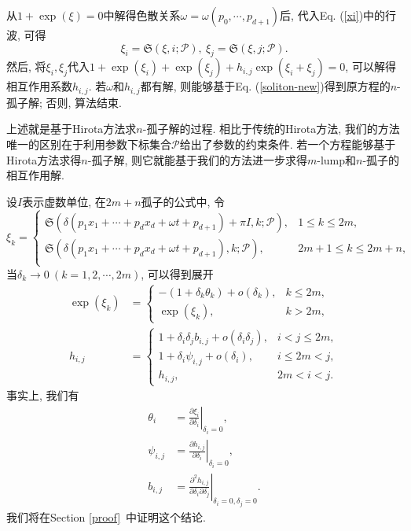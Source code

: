 \documentclass[12pt,a4paper,UTF8]{article}
\numberwithin{equation}{section}
\newcommand{\sbrace}[1]{\left(#1\right)}
\newcommand{\eval}[2]{\left.{#1}\right|_{#2}}
\newcommand{\PS}{\mathcal{P}}
\newcommand{\DIFF}[2]{\ensuremath{\frac{\partial #1}{\partial #2}}}
\newcommand{\SP}{\mathfrak{S}} %
\newcommand{\refeqn}[1]{Eq. (\ref{#1})}
\newcommand{\refsec}[1]{Section \ref{#1}~}
\newcommand{\MLNS}{$m$-lump和$n$-孤子的相互作用解}
\begin{document}
从$1+\exp(\xi)=0$中解得色散关系$\omega=\omega(p_0,\cdots,p_{d+1})$后, 代入\refeqn{xi}中的行波, 可得
\begin{equation}
  \xi_i=\SP\sbrace{\xi,i;\PS} , ~ \xi_j=\SP\sbrace{\xi,j;\PS} .
\end{equation}
然后, 将$\xi_i,\xi_j$代入$1+\exp(\xi_i)+\exp(\xi_j)+h_{i,j}\exp(\xi_i+\xi_j)=0$, 可以解得相互作用系数$h_{i,j}$. 若$\omega$和$h_{i,j}$都有解, 则能够基于\refeqn{soliton-new}得到原方程的$n$-孤子解; 否则, 算法结束. 

上述就是基于Hirota方法求$n$-孤子解的过程. 相比于传统的Hirota方法, 我们的方法唯一的区别在于利用参数下标集合$\PS$给出了参数的约束条件. 若一个方程能够基于Hirota方法求得$n$-孤子解, 则它就能基于我们的方法进一步求得\MLNS{}. 

设$I$表示虚数单位, 在$2m+n$孤子的公式中, 令
\begin{equation}
\xi_k=\left\{\begin{array}{ll}
  \SP\sbrace{\delta\sbrace{p_1 x_1+\cdots+p_d x_d+\omega t+p_{d+1}} +\pi I,k;\PS} ,&  1\le k\le 2m,\\
  \SP\sbrace{\delta\sbrace{p_1 x_1+\cdots+p_d x_d+\omega t+p_{d+1}},k;\PS} ,&  2m+1\le k \le 2m+n, \\
\end{array}\right. 
\end{equation}
当$\delta_k\to 0~(k=1,2,\cdots,2m)$, 可以得到展开
\begin{equation}
\begin{aligned}
  \exp\sbrace{\xi_k}&=\left\{\begin{array}{ll}
    -\sbrace{1+\delta_k \theta_k}+o\sbrace{\delta_k}, & k\le 2m, \\ 
    \exp\sbrace{\xi_k}, & k>2m,   
    \end{array}\right. \\ 
  h_{i,j}&=\left\{\begin{array}{ll}
    1+\delta_i \delta_j b_{i,j}+o\sbrace{\delta_i \delta_j}, & i<j\le 2m, \\
    1+\delta_i \psi_{i,j}+o\sbrace{\delta_i}, & i\le 2m < j , \\
    h_{i,j}, & 2m<i<j.
    \end{array}\right.
\end{aligned}
\label{expand}
\end{equation}
事实上, 我们有 
\begin{equation}
\begin{aligned} 
\theta_i &= \eval{\DIFF{\xi_i}{\delta_i}}{\delta_i=0},\\ 
\psi_{i,j} &= \eval{\DIFF{h_{i,j}}{\delta_i}}{\delta_i=0} ,\\ 
b_{i,j} &= \eval{\frac{\partial^2 h_{i,j}}{\partial \delta_i \partial \delta_j}}{\delta_i=0,\delta_j=0} .
\end{aligned}
\label{params}
\end{equation}
我们将在\refsec{proof}中证明这个结论. 
\end{document}
